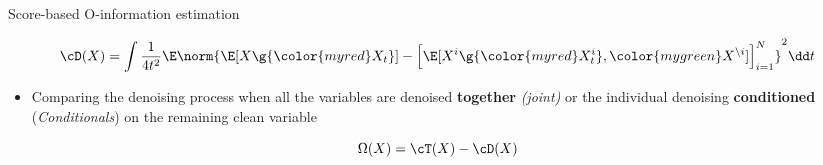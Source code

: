 

\begin{frame}{Score-based O-information estimation}



\begin{equation*}
\cD(X)  = \int \frac{1}{4t^2}\E\norm{\E[X\g {\color{myred} X_t }] - \left[ \E[X^i\g {\color{myred}X^i_t}, {\color{mygreen} X^{\setminus i} }] \right]_{i=1}^{N}}^2\dd t 
 \end{equation*}

\begin{itemize}
    \item Comparing the denoising process when all the variables are denoised \textbf{together} \textit{(joint)} or the individual denoising \textbf{conditioned} (\textit{Conditionals}) on the remaining clean variable 
\end{itemize}


\begin{equation*}
  \Omega(X)=\cT(X)-\cD(X)
\end{equation*}


\end{frame}



